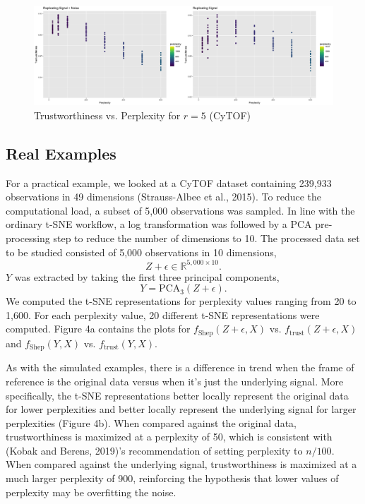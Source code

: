 \documentclass[webpdf,modern,large,namedate]{oup-authoring-template}
\theoremstyle{thmstyleone}%
\theoremstyle{thmstyletwo}%
\theoremstyle{thmstylethree}%
\begin{document}
\renewcommand{\thefigure}{5}
\begin{figure}[b]
\includegraphics[scale=0.22]{5 dim plot (CyTOF)}
\centering
\caption{Trustworthiness vs. Perplexity for $r = 5$ (CyTOF)}
\end{figure}

\subsection{Real Examples}
For a practical example, we looked at a CyTOF dataset containing 239,933 observations in 49 dimensions (Strauss-Albee et al., 2015). To reduce the computational load, a subset of 5,000 observations was sampled. In line with the ordinary t-SNE workflow, a log transformation was followed by a PCA pre-processing step to reduce the number of dimensions to 10. The processed data set to be studied consisted of 5,000 observations in 10 dimensions, $$Z + \epsilon \in \mathbb{R}^{5,000 \times 10}.$$  $Y$ was extracted by taking the first three principal components, $$Y = \textrm{PCA}_3(Z + \epsilon).$$ We computed the t-SNE representations for perplexity values ranging from 20 to 1,600. For each perplexity value, 20 different t-SNE representations were computed. Figure 4a contains the plots for $f_\textrm{Shep}(Z + \epsilon, X)$ vs. $f_\textrm{trust}(Z + \epsilon, X)$ and $f_\textrm{Shep}(Y, X)$ vs. $f_\textrm{trust}(Y, X)$.

As with the simulated examples, there is a difference in trend when the frame of reference is the original data versus when it's just the underlying signal. More specifically, the t-SNE representations better locally represent the original data for lower perplexities and better locally represent the underlying signal for larger perplexities (Figure 4b). When compared against the original data, trustworthiness is maximized at a perplexity of 50, which is consistent with (Kobak and Berens, 2019)'s recommendation of setting perplexity to $n/100$. When compared against the underlying signal, trustworthiness is maximized at a much larger perplexity of 900, reinforcing the hypothesis that lower values of perplexity may be overfitting the noise.
\end{document}

